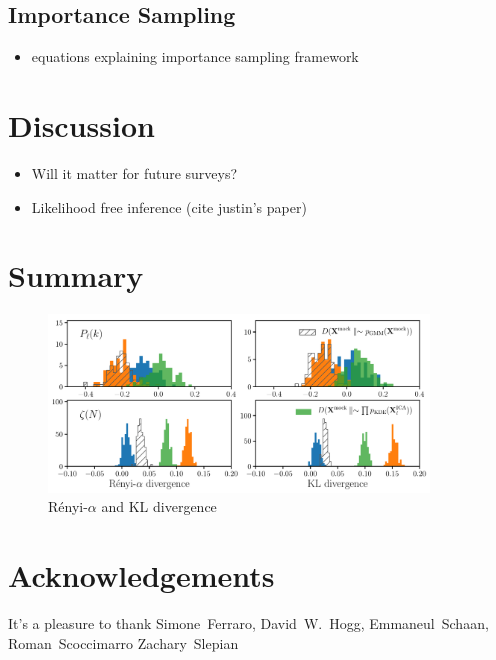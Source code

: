 \documentclass[12pt, letterpaper, preprint]{aastex}
\newcommand{\bitem}{\begin{itemize}}
\newcommand{\eitem}{\end{itemize}}
\begin{document}
\subsection{Importance Sampling} 
\bitem
    \item equations explaining importance sampling framework
\eitem

\section{Discussion}
\bitem
    \item Will it matter for future surveys? 
    \item Likelihood free inference (cite justin's paper) 
\eitem

\section{Summary}

\begin{figure}
\begin{center}
\includegraphics[width=0.9\textwidth]{figs/kNNdiverg_nonGauss.pdf}
\caption{R\'enyi-$\alpha$ and KL divergence}
\label{fig:div_nongauss}
\end{center}
\end{figure}

\section*{Acknowledgements}
It's a pleasure to thank 
    Simone~Ferraro,
    David~W.~Hogg,
    Emmaneul~Schaan, 
    Roman~Scoccimarro
    Zachary~Slepian



\end{document}
